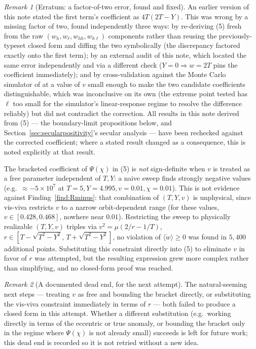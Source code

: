 \documentclass[12pt]{amsart}
\theoremstyle{plain}
\theoremstyle{remark}
\newtheorem*{remark}{Remark}
\begin{document}
\begin{remark}[Erratum: a factor-of-two error, found and fixed]\label{rem:erratum}
An earlier version of this note stated the first term's coefficient as $4T(2T-Y)$. This was wrong by a missing factor of two, found independently three ways: by re-deriving (5) fresh from the raw $(w_h,w_\ell,w_{hh},w_{h\ell})$ components rather than reusing the previously-typeset closed form and diffing the two symbolically (the discrepancy factored exactly onto the first term); by an external audit of this note, which located the same error independently and via a different check ($Y=0\Rightarrow w=2T$ pins the coefficient immediately); and by cross-validation against the Monte Carlo simulator of \cite{Ebert2026MonteCarloNote} at a value of $v$ small enough to make the two candidate coefficients distinguishable, which was inconclusive on its own (the extreme point tested has $\ell$ too small for the simulator's linear-response regime to resolve the difference reliably) but did not contradict the correction. All results in this note derived from (5) --- the boundary-limit propositions below, and Section~\ref{sec:secularpositivity}'s secular analysis --- have been rechecked against the corrected coefficient; where a stated result changed as a consequence, this is noted explicitly at that result.
\end{remark}

The bracketed coefficient of $\Psi(\chi)$ in (5) is \emph{not} sign-definite when $v$ is treated as a free parameter independent of $T,Y$: a naive sweep finds strongly negative values (e.g.\ $\approx-5\times10^7$ at $T=5,Y=4.995,v=0.01,\chi=0.01$). This is not evidence against Finding~\ref{find:Rminus}: that combination of $(T,Y,v)$ is unphysical, since vis-viva restricts $v$ to a narrow orbit-dependent range (for these values, $v\in[0.428,0.468]$, nowhere near $0.01$). Restricting the sweep to physically realizable $(T,Y,v)$ triples via $v^2=\mu(2/r-1/T)$, $r\in[T-\sqrt{T^2-Y^2},\,T+\sqrt{T^2-Y^2}]$, no violation of $\langle\dot w\rangle\geq0$ was found in $5{,}400$ additional points. Substituting this constraint directly into (5) to eliminate $v$ in favor of $r$ was attempted, but the resulting expression grew more complex rather than simplifying, and no closed-form proof was reached.

\begin{remark}[A documented dead end, for the next attempt]
The natural-seeming next steps --- treating $v$ as free and bounding the bracket directly, or substituting the vis-viva constraint immediately in terms of $r$ --- both failed to produce a closed form in this attempt. Whether a different substitution (e.g.\ working directly in terms of the eccentric or true anomaly, or bounding the bracket only in the regime where $\Psi(\chi)$ is not already small) succeeds is left for future work; this dead end is recorded so it is not retried without a new idea.
\end{remark}
\end{document}
